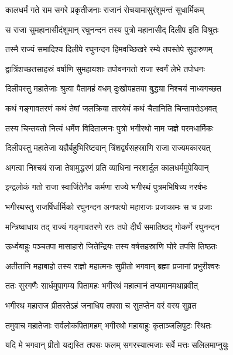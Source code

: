 
\twolineshloka
{कालधर्मं गते राम सगरे प्रकृतीजनाः}
{राजानं रोचयामासुरंशुमन्तं सुधार्मिकम्} %

\twolineshloka
{स राजा सुमहानासीदंशुमान् रघुनन्दन}
{तस्य पुत्रो महानासीद् दिलीप इति विश्रुतः} %

\twolineshloka
{तस्मै राज्यं समादिश्य दिलीपे रघुनन्दन}
{हिमवच्छिखरे रम्ये तपस्तेपे सुदारुणम्} %

\twolineshloka
{द्वात्रिंशच्छतसाहस्रं वर्षाणि सुमहायशाः}
{तपोवनगतो राजा स्वर्गं लेभे तपोधनः} %

\twolineshloka
{दिलीपस्तु महातेजाः श्रुत्वा पैतामहं वधम्}
{दुःखोपहतया बुद्ध्या निश्चयं नाध्यगच्छत} %

\twolineshloka
{कथं गङ्गावतरणं कथं तेषां जलक्रिया}
{तारयेयं कथं चैतानिति चिन्तापरोऽभवत्} %

\twolineshloka
{तस्य चिन्तयतो नित्यं धर्मेण विदितात्मनः}
{पुत्रो भगीरथो नाम जज्ञे परमधार्मिकः} %

\twolineshloka
{दिलीपस्तु महातेजा यज्ञैर्बहुभिरिष्टवान्}
{त्रिंशद्वर्षसहस्राणि राजा राज्यमकारयत्} %

\twolineshloka
{अगत्वा निश्चयं राजा तेषामुद्धरणं प्रति}
{व्याधिना नरशार्दूल कालधर्ममुपेयिवान्} %

\twolineshloka
{इन्द्रलोकं गतो राजा स्वार्जितेनैव कर्मणा}
{राज्ये भगीरथं पुत्रमभिषिच्य नरर्षभः} %

\twolineshloka
{भगीरथस्तु राजर्षिर्धार्मिको रघुनन्दन}
{अनपत्यो महाराजः प्रजाकामः स च प्रजाः} %

\twolineshloka
{मन्त्रिष्वाधाय तद् राज्यं गङ्गावतरणे रतः}
{तपो दीर्घं समातिष्ठद् गोकर्णे रघुनन्दन} %

\twolineshloka
{ऊर्ध्वबाहुः पञ्चतपा मासाहारो जितेन्द्रियः}
{तस्य वर्षसहस्राणि घोरे तपसि तिष्ठतः} %

\twolineshloka
{अतीतानि महाबाहो तस्य राज्ञो महात्मनः}
{सुप्रीतो भगवान् ब्रह्मा प्रजानां प्रभुरीश्वरः} %

\twolineshloka
{ततः सुरगणैः सार्धमुपागम्य पितामहः}
{भगीरथं महात्मानं तप्यमानमथाब्रवीत्} %

\twolineshloka
{भगीरथ महाराज प्रीतस्तेऽहं जनाधिप}
{तपसा च सुतप्तेन वरं वरय सुव्रत} %

\twolineshloka
{तमुवाच महातेजाः सर्वलोकपितामहम्}
{भगीरथो महाबाहुः कृताञ्जलिपुटः स्थितः} %

\twolineshloka
{यदि मे भगवान् प्रीतो यद्यस्ति तपसः फलम्}
{सगरस्यात्मजाः सर्वे मत्तः सलिलमाप्नुयुः} %

